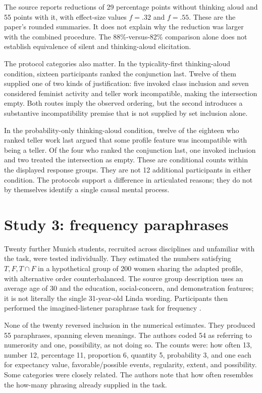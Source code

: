 The source reports reductions of 29 percentage points without thinking
aloud and 55 points with it, with effect-size values \(f=.32\)
and \(f=.55\). These are the paper's rounded summaries.
It does not explain why the reduction was larger with the combined
procedure. The 88\%-versus-82\% comparison alone does not establish
equivalence of silent and thinking-aloud elicitation.

The protocol categories also matter. In the typicality-first
thinking-aloud condition, sixteen participants ranked the conjunction
last. Twelve of them supplied one of two kinds of justification:
five invoked class inclusion and seven considered feminist activity
and teller work incompatible, making the intersection empty.
Both routes imply the observed ordering, but the second introduces
a substantive incompatibility premise that is not supplied by set
inclusion alone.

In the probability-only thinking-aloud condition, twelve of the
eighteen who ranked teller work last argued that some profile
feature was incompatible with being a teller.
Of the four who ranked the conjunction last, one invoked inclusion
and two treated the intersection as empty.
These are conditional counts within the displayed response groups.
They are not 12 additional participants in either condition.
The protocols support a difference in articulated reasons; they
do not by themselves identify a single causal mental process.

\section{Study 3: frequency paraphrases}
\label{sec:p19-conjunction-language-study-three}

Twenty further Munich students, recruited across disciplines and
unfamiliar with the task, were tested individually.
They estimated the numbers satisfying \(T,F,T\cap F\) in a
hypothetical group of 200 women sharing the adapted profile, with
alternative order counterbalanced. The source group description
uses an average age of 30 and the education, social-concern, and
demonstration features; it is not literally the single 31-year-old
Linda wording. Participants then performed the imagined-listener
paraphrase task for frequency
\cite[pp.~287--288, Exhibit~3]{HertwigGigerenzer1999Conjunction}.

None of the twenty reversed inclusion in the numerical estimates.
They produced 55 paraphrases, spanning eleven meanings.
The authors coded 54 as referring to numerosity and one, possibility,
as not doing so. The counts were: how often 13, number 12,
percentage 11, proportion 6, quantity 5, probability 3, and one
each for expectancy value, favorable/possible events, regularity,
extent, and possibility. Some categories were closely related.
The authors note that how often resembles the how-many phrasing
already supplied in the task.

